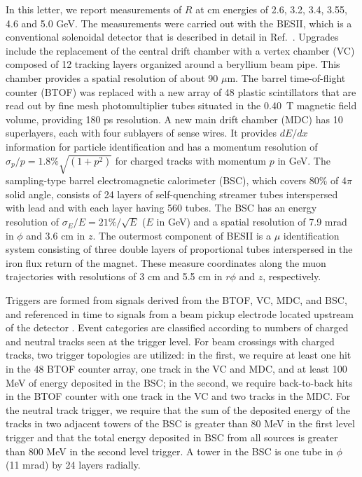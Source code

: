 In this letter, we report measurements of $R$ at cm energies of
2.6, 3.2, 3.4, 3.55, 4.6 and 5.0 GeV. 
The measurements were carried out with the
BESII, which is a conventional solenoidal detector that is described
in detail in Ref.~\cite{10}.  Upgrades include the replacement of
the central drift chamber with a vertex chamber (VC) composed of 12
tracking layers organized around a beryllium beam pipe.  This chamber
provides a spatial resolution of about 90 $\mu$m.  The barrel
time-of-flight counter (BTOF) was replaced with a new array of 48
plastic scintillators that are read out by fine mesh photomultiplier
tubes situated in the 0.40~T magnetic field volume, providing 180 ps
resolution.  A new main drift chamber (MDC) has 10 superlayers, each
with four sublayers of sense wires.  It provides $dE/dx$ information for
particle identification and has a momentum resolution of $\sigma_p/p=1.8
\%\sqrt{(1+p^2)}$ for charged tracks with momentum $p$ in GeV.  The
sampling-type barrel electromagnetic calorimeter (BSC), which covers
80\% of 4$\pi$ solid angle, consists of 24 layers of self-quenching
streamer tubes interspersed with lead and with each layer having  560
tubes. The BSC has an energy
resolution of $\sigma_E/E=21 \%/\sqrt{E}$ ($E$ in GeV) and a spatial
resolution of 7.9 mrad in $\phi$ and 3.6 cm in $z$.  The outermost
component of BESII is a $\mu$ identification system consisting of three
double layers of proportional tubes interspersed in the iron flux return of
the magnet.  These measure coordinates along the muon trajectories with
resolutions of 3 cm and 5.5 cm in $r\phi$ and $z$, respectively.

Triggers are formed from signals derived from the BTOF, VC, MDC, and BSC, and 
referenced in time to signals from a beam pickup electrode located upstream
of the detector \cite{10}.
Event categories are classified according
to numbers of charged and neutral tracks seen at the trigger level.
For beam crossings with charged tracks, two trigger topologies are
utilized: in the first, we require at least one hit
in the 48 BTOF counter array, one track in the VC and MDC,
and at least 100 MeV of energy deposited in the BSC; in the second, we require
back-to-back hits in the BTOF counter with one
track in the VC and two tracks in the MDC.  For the neutral track trigger,
we require that
the sum of the deposited energy of the tracks in two adjacent towers of the
BSC is greater than 80 MeV in the first level trigger and that the total energy
deposited in BSC from all sources is greater than 800 MeV in the second level
trigger.  A tower in the BSC is one tube in $\phi$ (11 mrad) by 24
layers radially.

